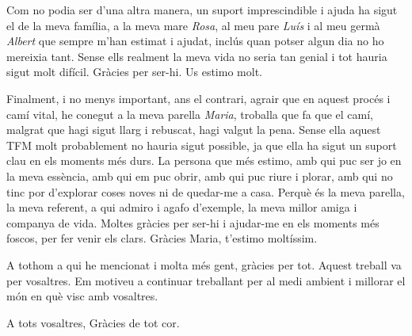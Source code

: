 \documentclass[../main.tex]{subfiles}
\begin{document}
Com no podia ser d'una altra manera, un suport imprescindible i ajuda ha sigut el de la meva família, a la meva mare \textit{Rosa}, al meu pare \textit{Luís} i al meu germà \textit{Albert} que sempre m'han estimat i ajudat, inclús quan potser algun dia no ho mereixia tant. Sense ells realment la meva vida no seria tan genial i tot hauria sigut molt difícil. Gràcies per ser-hi. Us estimo molt.

Finalment, i no menys important, ans el contrari, agrair que en aquest procés i camí vital, he conegut a la meva parella \textit{Maria}, troballa que fa que el camí, malgrat que hagi sigut llarg i rebuscat, hagi valgut la pena. Sense ella aquest TFM molt probablement no hauria sigut possible, ja que ella ha sigut un suport clau en els moments més durs. La persona que més estimo, amb qui puc ser jo en la meva essència, amb qui em puc obrir, amb qui puc riure i plorar, amb qui no tinc por d'explorar coses noves ni de quedar-me a casa. Perquè és la meva parella, la meva referent, a qui admiro i agafo d'exemple, la meva millor amiga i companya de vida. Moltes gràcies per ser-hi i ajudar-me en els moments més foscos, per fer venir els clars. Gràcies Maria, t'estimo moltíssim.

A tothom a qui he mencionat i molta més gent, gràcies per tot. Aquest treball va per vosaltres. Em motiveu a continuar treballant per al medi ambient i millorar el món en què visc amb vosaltres.

A tots vosaltres, Gràcies de tot cor.
 
\end{document}
